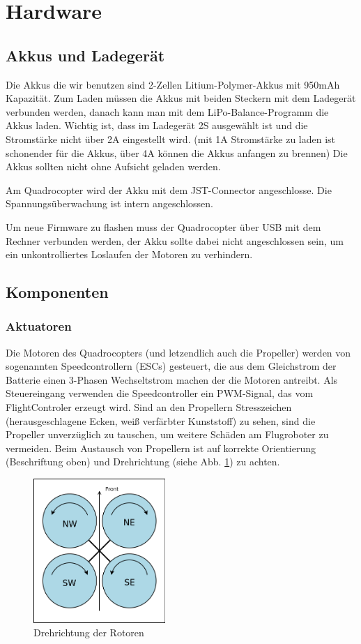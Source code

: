 \section{Hardware}

\subsection{Akkus und Ladegerät}
Die Akkus die wir benutzen sind 2-Zellen Litium-Polymer-Akkus mit 950mAh Kapazität.
Zum Laden müssen die Akkus mit beiden Steckern mit dem Ladegerät verbunden werden, danach kann man mit dem LiPo-Balance-Programm die Akkus laden.
Wichtig ist, dass im Ladegerät 2S ausgewählt ist und die Stromstärke nicht über 2A eingestellt wird.
(mit 1A Stromstärke zu laden ist schonender für die Akkus, über 4A können die Akkus anfangen zu brennen)
Die Akkus sollten nicht ohne Aufsicht geladen werden.

Am Quadrocopter wird der Akku mit dem JST-Connector angeschlosse. Die Spannungsüberwachung ist intern angeschlossen.

Um neue Firmware zu flashen muss der Quadrocopter über USB mit dem Rechner verbunden werden, der Akku sollte dabei nicht angeschlossen sein, um ein unkontrolliertes Loslaufen der Motoren zu verhindern.

\subsection{Komponenten}
\subsubsection{Aktuatoren}

Die Motoren des Quadrocopters (und letzendlich auch die Propeller) werden von sogenannten Speedcontrollern (ESCs) gesteuert, die aus dem Gleichstrom der Batterie einen 3-Phasen Wechseltstrom machen der die Motoren antreibt.
Als Steuereingang verwenden die Speedcontroller ein PWM-Signal, das vom FlightControler erzeugt wird.
Sind an den Propellern Stresszeichen (herausgeschlagene Ecken, weiß verfärbter Kunststoff) zu sehen, sind die Propeller unverzüglich zu tauschen, um weitere Schäden am Flugroboter zu vermeiden.
Beim Austausch von Propellern ist auf korrekte Orientierung (Beschriftung oben) und Drehrichtung (siehe Abb. \ref{drehrichtung}) zu achten.

\begin{figure}[h]
	\centering
	\includegraphics[width=5cm]{img/drehrichtung}
	\caption{Drehrichtung der Rotoren}
	\label{drehrichtung}

\end{figure}


